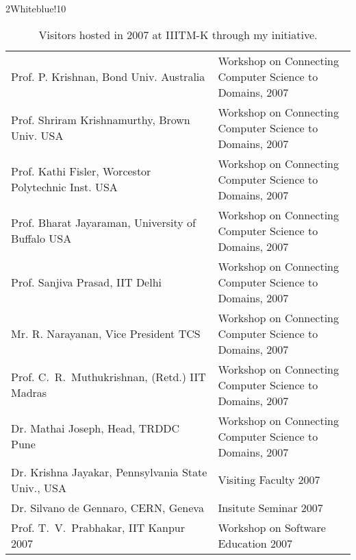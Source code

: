 \documentclass[titlepage, %
11pt, 
]{article}
\begin{document}
\begin{table}
\rowcolors%
{2}{White}{blue!10}
\setlength\extrarowheight{4pt}
\begin{tabular}%
{|p{0.6\linewidth}|p{0.6\linewidth}|}
\hline
\multicolumn{1}{|m{0.6\linewidth}|}{\centering {\bf Person and Affiliation}}&
\multicolumn{1}{m{0.6\linewidth}|}{\centering {\bf Event and Date}}\\
\hline
%
Prof. P. Krishnan, Bond Univ. Australia & Workshop on
Connecting Computer Science to Domains, 2007\\
%
Prof. Shriram Krishnamurthy, Brown Univ. USA & Workshop on
Connecting Computer Science to Domains, 2007\\
%
Prof. Kathi Fisler, Worcestor Polytechnic Inst. USA & Workshop on
Connecting Computer Science to Domains, 2007\\
%
Prof. Bharat Jayaraman, University of Buffalo USA & Workshop on
Connecting Computer Science to Domains, 2007\\
%
Prof. Sanjiva Prasad, IIT Delhi & Workshop on
Connecting Computer Science to Domains, 2007\\
%
Mr. R. Narayanan, Vice President TCS & Workshop on
Connecting Computer Science to Domains, 2007\\
%
Prof. C.~R.~Muthukrishnan, (Retd.) IIT Madras & Workshop on
Connecting Computer Science to Domains, 2007\\
%
Dr. Mathai Joseph, Head, TRDDC Pune & Workshop on
Connecting Computer Science to Domains, 2007\\
%
Dr. Krishna Jayakar, Pennsylvania State Univ., USA & Visiting Faculty 2007\\
%
Dr. Silvano de Gennaro, CERN, Geneva  & Insitute Seminar 2007\\
%
Prof. T.~V.~Prabhakar, IIT Kanpur 2007 & Workshop on Software Education 2007\\
\hline
\end{tabular}
\caption{Visitors hosted in 2007 at IIITM-K through my initiative.
\label{tbl:visitors-2007}}
\end{table}
\end{document}
